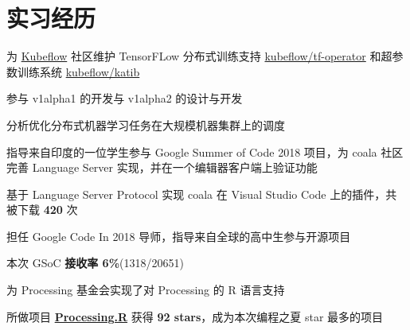 \documentclass[]{deedy-resume-openfont}
\begin{document}
\begin{minipage}[t]{0.68\textwidth}


\section{实习经历}

\sectionsep
{}
\vspace{\topsep}
\begin{tightemize}
    \item 为 \href{https://github.com/kubeflow/kubeflow}{Kubeflow} 社区维护 TensorFLow 分布式训练支持 \href{https://github.com/kubeflow/tf-operator}{kubeflow/tf-operator} 和超参数训练系统 \href{https://github.com/kubeflow/katib}{kubeflow/katib}
    \item 参与 v1alpha1 的开发与 v1alpha2 的设计与开发
    \item 分析优化分布式机器学习任务在大规模机器集群上的调度
\end{tightemize}
\sectionsep

\sectionsep
{}
\vspace{\topsep}
\begin{tightemize}
    \item 指导来自印度的一位学生参与 Google Summer of Code 2018 项目，为 coala 社区完善 Language Server 实现，并在一个编辑器客户端上验证功能
\end{tightemize}
\sectionsep

\sectionsep
{}
\vspace{\topsep}
\begin{tightemize}
    \item 基于 Language Server Protocol 实现 coala 在 Visual Studio Code 上的插件，共被下载 \textbf{420} 次
    \item 担任 Google Code In 2018 导师，指导来自全球的高中生参与开源项目
\end{tightemize}
\sectionsep

\sectionsep
{}
\vspace{\topsep}
\begin{tightemize}
    \item 本次 GSoC \textbf{接收率 6\%}(1318/20651)
    \item 为 Processing 基金会实现了对 Processing 的 R 语言支持
    \item 所做项目 \href{https://github.com/gaocegege/Processing.R}{\bf Processing.R} 获得 \textbf{92 stars}，成为本次编程之夏 star 最多的项目
\end{tightemize}
\sectionsep


\end{minipage}
\end{document}
